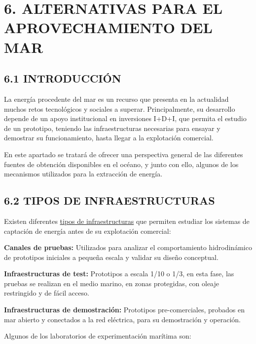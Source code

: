 \documentclass[]{article}
\date{}
\begin{document}
\section{6. ALTERNATIVAS PARA EL APROVECHAMIENTO DEL
MAR}\label{header-n2}

\subsection{6.1 INTRODUCCIÓN}\label{header-n3}

La energía procedente del mar es un recurso que presenta en la
actualidad muchos retos tecnológicos y sociales a superar.
Principalmente, su desarrollo depende de un apoyo institucional en
inversiones I+D+I, que permita el estudio de un prototipo, teniendo las
infraestructuras necesarias para ensayar y demostrar su funcionamiento,
hasta llegar a la explotación comercial.

En este apartado se tratará de ofrecer una perspectiva general de las
diferentes fuentes de obtención disponibles en el océano, y junto con
ello, algunos de los mecanismos utilizados para la extracción de
energía.

\subsection{6.2 TIPOS DE INFRAESTRUCTURAS}\label{header-n8}

Existen diferentes
\href{http://www.udc.es/iuem/documentos/doc_xornadas/anaeco/APROVEITAMENTODAENERXIADASOLAS.pdf}{tipos
de infraestructuras} que permiten estudiar los sistemas de captación de
energía antes de su explotación comercial:

\textbf{Canales de pruebas:} Utilizados para analizar el comportamiento
hidrodinámico de prototipos iniciales a pequeña escala y validar su
diseño conceptual.

\textbf{Infraestructuras de test:} Prototipos a escala 1/10 o 1/3, en
esta fase, las pruebas se realizan en el medio marino, en zonas
protegidas, con oleaje restringido y de fácil acceso.

\textbf{Infraestructuras de demostración:} Prototipos pre-comerciales,
probados en mar abierto y conectados a la red eléctrica, para su
demostración y operación.

Algunos de los laboratorios de experimentación marítima son:
\end{document}
